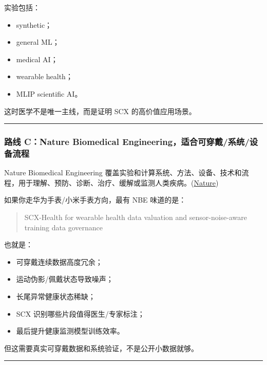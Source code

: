 \documentclass[
  12pt,
]{ctexart}
\providecommand{\tightlist}{%
  \setlength{\itemsep}{0pt}\setlength{\parskip}{0pt}}
\begin{document}
实验包括：

\begin{itemize}
\tightlist
\item
  synthetic；
\item
  general ML；
\item
  medical AI；
\item
  wearable health；
\item
  MLIP scientific AI。
\end{itemize}

这时医学不是唯一主线，而是证明 SCX 的高价值应用场景。

\begin{center}\rule{0.5\linewidth}{0.5pt}\end{center}

\subsubsection{路线 C：Nature Biomedical
Engineering，适合可穿戴/系统/设备流程}\label{ux8defux7ebf-cnature-biomedical-engineeringux9002ux5408ux53efux7a7fux6234ux7cfbux7edfux8bbeux5907ux6d41ux7a0b}

Nature Biomedical Engineering
覆盖实验和计算系统、方法、设备、技术和流程，用于理解、预防、诊断、治疗、缓解或监测人类疾病。(\href{https://arxiv.org/abs/2404.07965?utm_source=chatgpt.com}{Nature})

如果你走华为手表/小米手表方向，最有 NBE 味道的是：

\begin{quote}
SCX-Health for wearable health data valuation and sensor-noise-aware
training data governance
\end{quote}

也就是：

\begin{itemize}
\tightlist
\item
  可穿戴连续数据高度冗余；
\item
  运动伪影/佩戴状态导致噪声；
\item
  长尾异常健康状态稀缺；
\item
  SCX 识别哪些片段值得医生/专家标注；
\item
  最后提升健康监测模型训练效率。
\end{itemize}

但这需要真实可穿戴数据和系统验证，不是公开小数据就够。

\begin{center}\rule{0.5\linewidth}{0.5pt}\end{center}
\end{document}
